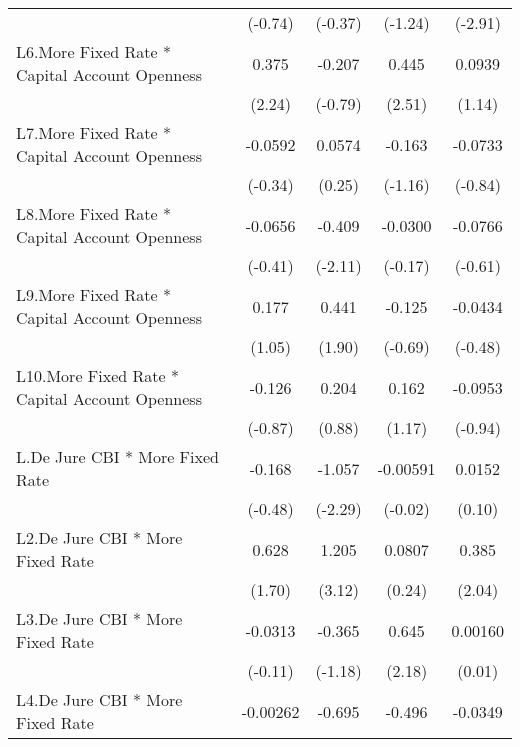 {\begin{longtable}{l*{4}{c}}
                &  (-0.74)         &  (-0.37)         &  (-1.24)         &  (-2.91)         \\
[1em]
L6.More Fixed Rate * Capital Account Openness&    0.375\sym{*}  &   -0.207         &    0.445\sym{*}  &   0.0939         \\
                &   (2.24)         &  (-0.79)         &   (2.51)         &   (1.14)         \\
[1em]
L7.More Fixed Rate * Capital Account Openness&  -0.0592         &   0.0574         &   -0.163         &  -0.0733         \\
                &  (-0.34)         &   (0.25)         &  (-1.16)         &  (-0.84)         \\
[1em]
L8.More Fixed Rate * Capital Account Openness&  -0.0656         &   -0.409\sym{*}  &  -0.0300         &  -0.0766         \\
                &  (-0.41)         &  (-2.11)         &  (-0.17)         &  (-0.61)         \\
[1em]
L9.More Fixed Rate * Capital Account Openness&    0.177         &    0.441         &   -0.125         &  -0.0434         \\
                &   (1.05)         &   (1.90)         &  (-0.69)         &  (-0.48)         \\
[1em]
L10.More Fixed Rate * Capital Account Openness&   -0.126         &    0.204         &    0.162         &  -0.0953         \\
                &  (-0.87)         &   (0.88)         &   (1.17)         &  (-0.94)         \\
[1em]
L.De Jure CBI * More Fixed Rate&   -0.168         &   -1.057\sym{*}  & -0.00591         &   0.0152         \\
                &  (-0.48)         &  (-2.29)         &  (-0.02)         &   (0.10)         \\
[1em]
L2.De Jure CBI * More Fixed Rate&    0.628         &    1.205\sym{**} &   0.0807         &    0.385\sym{*}  \\
                &   (1.70)         &   (3.12)         &   (0.24)         &   (2.04)         \\
[1em]
L3.De Jure CBI * More Fixed Rate&  -0.0313         &   -0.365         &    0.645\sym{*}  &  0.00160         \\
                &  (-0.11)         &  (-1.18)         &   (2.18)         &   (0.01)         \\
[1em]
L4.De Jure CBI * More Fixed Rate& -0.00262         &   -0.695         &   -0.496         &  -0.0349         \\

\end{longtable}}
